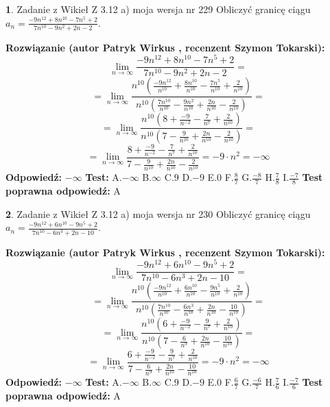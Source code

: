 \documentclass[12pt, a4paper]{article}
\theoremstyle{definition} %
\newtheorem{zad}{}
\newcommand{\zadStart}[1]{\begin{zad}#1\newline}
\newcommand{\zadStop}{\end{zad}}
\newcommand{\rozwStart}[2]{\noindent \textbf{Rozwiązanie (autor #1 , recenzent #2): }\newline}
\newcommand{\rozwStop}{\newline}
\newcommand{\odpStart}{\noindent \textbf{Odpowiedź:}\newline}
\newcommand{\odpStop}{\newline}
\newcommand{\testStart}{\noindent \textbf{Test:}\newline}
\newcommand{\testStop}{\newline}
\newcommand{\kluczStart}{\noindent \textbf{Test poprawna odpowiedź:}\newline}
\newcommand{\kluczStop}{\newline}
\begin{document}
\zadStart{Zadanie z Wikieł Z 3.12 a) moja wersja nr 229}
Obliczyć granicę ciągu $a_{n}=\frac{-9n^{12}+8n^{10}-7n^{5}+2}{7n^{10}-9n^{2}+2n-2}$.
\zadStop
\rozwStart{Patryk Wirkus}{Szymon Tokarski}
$$\lim\limits_{n\to\infty}\frac{-9n^{12}+8n^{10}-7n^{5}+2}{7n^{10}-9n^{2}+2n-2}=$$
$$=\lim\limits_{n\to\infty}\frac{n^{10}\left(\frac{-9n^{12}}{n^{10}}+\frac{8n^{10}}{n^{10}}-\frac{7n^{5}}{n^{10}}+\frac{2}{n^{10}}\right)}{n^{10}\left(\frac{7n^{10}}{n^{10}}-\frac{9n^{2}}{n^{10}}+\frac{2n}{n^{10}}-\frac{2}{n^{10}}\right)}=$$
$$=\lim\limits_{n\to\infty}\frac{n^{10}\left(8+\frac{-9}{n^{-2}}-\frac{7}{n^{7}}+\frac{2}{n^{10}}\right)}
{n^{10}\left(7-\frac{9}{n^{10}}+\frac{2n}{n^{10}}-\frac{2}{n^{10}}\right)}=$$
$$=\lim\limits_{n\to\infty}\frac{8+\frac{-9}{n^{-2}}-\frac{7}{n^{7}}+\frac{2}{n^{10}}}{7-\frac{9}{n^{10}}+\frac{2n}{n^{10}}-\frac{2}{n^{10}}}=-9\cdot n^{2} = -\infty$$
\rozwStop
\odpStart
$-\infty$
\odpStop
\testStart
A.$-\infty$
B.$\infty$
C.$9$
D.$-9$
E.$0$
F.$\frac{8}{7}$
G.$\frac{-8}{7}$
H.$\frac{7}{8}$
I.$\frac{-7}{8}$
\testStop
\kluczStart
A
\kluczStop



\zadStart{Zadanie z Wikieł Z 3.12 a) moja wersja nr 230}
Obliczyć granicę ciągu $a_{n}=\frac{-9n^{12}+6n^{10}-9n^{5}+2}{7n^{10}-6n^{3}+2n-10}$.
\zadStop
\rozwStart{Patryk Wirkus}{Szymon Tokarski}
$$\lim\limits_{n\to\infty}\frac{-9n^{12}+6n^{10}-9n^{5}+2}{7n^{10}-6n^{3}+2n-10}=$$
$$=\lim\limits_{n\to\infty}\frac{n^{10}\left(\frac{-9n^{12}}{n^{10}}+\frac{6n^{10}}{n^{10}}-\frac{9n^{5}}{n^{10}}+\frac{2}{n^{10}}\right)}{n^{10}\left(\frac{7n^{10}}{n^{10}}-\frac{6n^{3}}{n^{10}}+\frac{2n}{n^{10}}-\frac{10}{n^{10}}\right)}=$$
$$=\lim\limits_{n\to\infty}\frac{n^{10}\left(6+\frac{-9}{n^{-2}}-\frac{9}{n^{7}}+\frac{2}{n^{10}}\right)}
{n^{10}\left(7-\frac{6}{n^{9}}+\frac{2n}{n^{10}}-\frac{10}{n^{10}}\right)}=$$
$$=\lim\limits_{n\to\infty}\frac{6+\frac{-9}{n^{-2}}-\frac{9}{n^{7}}+\frac{2}{n^{10}}}{7-\frac{6}{n^{9}}+\frac{2n}{n^{10}}-\frac{10}{n^{10}}}=-9\cdot n^{2} = -\infty$$
\rozwStop
\odpStart
$-\infty$
\odpStop
\testStart
A.$-\infty$
B.$\infty$
C.$9$
D.$-9$
E.$0$
F.$\frac{6}{7}$
G.$\frac{-6}{7}$
H.$\frac{7}{6}$
I.$\frac{-7}{6}$
\testStop
\kluczStart
A
\kluczStop
\end{document}
